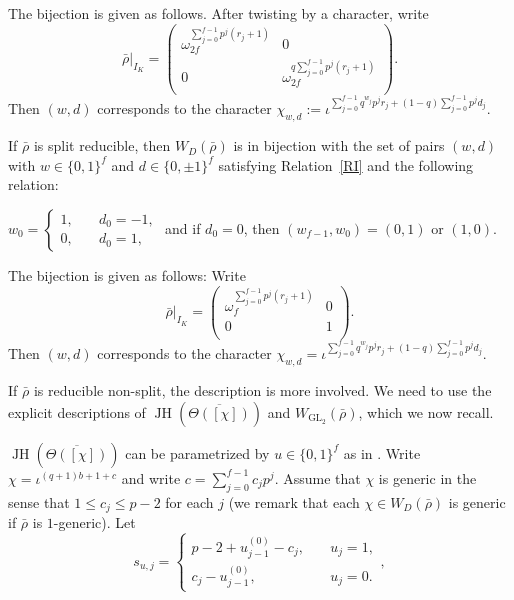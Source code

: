 \documentclass{article}
\numberwithin{equation}{section}
\DeclareMathOperator{\GL}{GL}
\DeclareMathOperator{\JH}{JH}
\begin{document}
The bijection is given as follows. After twisting by a character, write 
$$\bar{\rho}|_{I_K}=\left(\begin{array}{cc}
    \omega_{2f}^{\sum_{j=0}^{f-1}p^j(r_j+1)}&0\\
    0&  \omega_{2f}^{q\sum_{j=0}^{f-1}p^j(r_j+1)}\\
\end{array}\right).$$ 
Then $(w,d)$ corresponds to the character $\chi_{w,d}:=\iota^{\sum_{j=0}^{f-1}q^{w_j}p^jr_j+(1-q)\sum_{j=0}^{f-1}p^jd_j}$.


If $\bar{\rho}$ is split reducible, then $W_D(\bar{\rho})$ is in bijection with the set of pairs $(w,d)$ with $w\in \{0,1\}^f$ and $d\in\{0,\pm 1\}^f$ satisfying Relation~\ref{RI} and the following relation: 

\begin{enumerate}[label={[II$^\prime$]},ref={[II$^\prime$]}]
    \item\label{RII'}
$w_0=\begin{cases}
    1, \quad & d_0=-1,\\
    0, \quad & d_0=1, 
\end{cases}$ and if $d_0=0$, then $(w_{f-1}, w_{0})=(0,1)$ or $(1,0)$. 
  \end{enumerate}

The bijection is given as follows: Write 
$$\bar{\rho}|_{I_K}=\left(\begin{array}{cc}
    \omega_{f}^{\sum_{j=0}^{f-1}p^j(r_j+1)}&0\\
    0&1\\
\end{array}\right).$$ 
Then $(w,d)$ corresponds to the character $\chi_{w,d}=\iota^{\sum_{j=0}^{f-1}q^{w_j}p^jr_j+(1-q)\sum_{j=0}^{f-1}p^jd_j}$. 

If $\bar{\rho}$ is reducible non-split, the description is more involved. We need to use the explicit descriptions of $\JH(\overline{\Theta([\chi])})$ and $W_{\GL_2}(\bar{\rho})$, which we now recall. 

$\JH(\overline{\Theta([\chi])})$ can be parametrized by $u\in \{0,1\}^f$ as in \cite[\S~2.2]{CW23}. Write $\chi=\iota^{(q+1)b+1+c}$ and write $c=\sum_{j=0}^{f-1}c_jp^j$. 
Assume that $\chi$ is generic in the sense that $1\leq c_j\leq p-2$ for each $j$ (we remark that each $\chi\in W_D(\bar{\rho})$ is generic if $\bar{\rho}$ is $1$-generic). Let 
\begin{equation}
    s_{u,j}=\begin{cases}
        p-2+u^{(0)}_{j-1}-c_j, \quad & u_j=1,\\
        c_j-u^{(0)}_{j-1},\quad & u_j=0. 
    \end{cases},
\end{equation}
\end{document}
